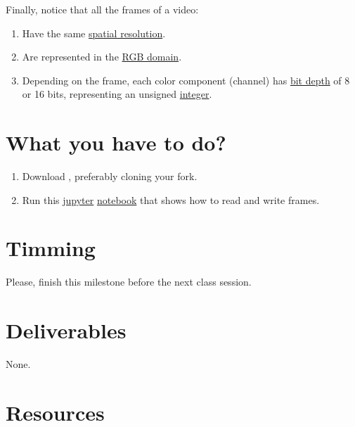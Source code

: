 Finally, notice that all the frames of a video:
\begin{enumerate}
\item Have the same
  \href{https://en.wikipedia.org/wiki/Image_resolution}{spatial
    resolution}.
\item Are represented in the
  \href{https://en.wikipedia.org/wiki/RGB_color_model}{RGB domain}.
\item Depending on the frame, each color component (channel) has
  \href{https://en.wikipedia.org/wiki/Glossary_of_computer_graphics#bit_depth}{bit
    depth} of 8 or 16 bits, representing an unsigned
  \href{https://en.wikipedia.org/wiki/Integer_(computer_science)}{integer}.
\end{enumerate}
  
\section{What you have to do?}

\begin{enumerate}
\item Download \theproject{}, preferably cloning your fork.
\item Run this \href{https://jupyter.org/}{jupyter}
  \href{https://github.com/Sistemas-Multimedia/Sistemas-Multimedia.github.io/blob/master/milestone/04-the_data/display_video.ipynb}{notebook}
  that shows how to read and write frames.
\end{enumerate}

\section{Timming}

Please, finish this milestone before the next class session.

\section{Deliverables}

None.

\section{Resources}

\renewcommand{\addcontentsline}[3]{}%

